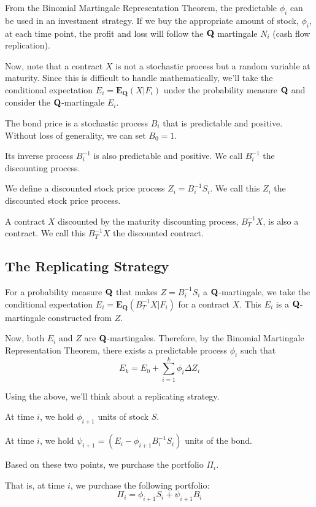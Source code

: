 \documentclass[uplatex,a4j,12pt,dvipdfmx]{jsarticle}
\begin{document}
From the Binomial Martingale Representation Theorem, the predictable $\phi_{i}$ can be used in an investment strategy. If we buy the appropriate amount of stock, $\phi_{i}$, at each time point, the profit and loss will follow the ${\bf Q}$ martingale $N_{i}$ (cash flow replication).

Now, note that a contract $X$ is not a stochastic process but a random variable at maturity. Since this is difficult to handle mathematically, we'll take the conditional expectation $E_{i} = \mathbf{E_{Q}}( X | F_{i} )$ under the probability measure ${\bf Q}$ and consider the ${\bf Q}$-martingale $E_{i}$.

The bond price is a stochastic process $B_{i}$ that is predictable and positive. Without loss of generality, we can set $B_{0} = 1$.

Its inverse process $B_{i}^{-1}$ is also predictable and positive. We call $B_{i}^{-1}$ the discounting process.

We define a discounted stock price process $Z_{i} = B_{i}^{-1} S_{i}$. We call this $Z_{i}$ the discounted stock price process.

A contract $X$ discounted by the maturity discounting process, $B_{T}^{-1} X$, is also a contract. We call this $B_{T}^{-1} X$ the discounted contract.

\subsection{The Replicating Strategy}
For a probability measure ${\bf Q}$ that makes $Z = B_{i}^{-1} S_{i}$ a ${\bf Q}$-martingale, we take the conditional expectation $E_{i} = \mathbf{E_{Q}}( B_{T}^{-1} X | F_{i} )$ for a contract $X$. This $E_{i}$ is a ${\bf Q}$-martingale constructed from $Z$.

Now, both $E_{i}$ and $Z$ are ${\bf Q}$-martingales. Therefore, by the Binomial Martingale Representation Theorem, there exists a predictable process $\phi_{i}$ such that \[E_{k} = E_{0} + \sum^{k}_{i=1} \phi_{i} \Delta Z_{i}\]

Using the above, we'll think about a replicating strategy.

At time $i$, we hold $\phi_{i+1}$ units of stock $S$.

At time $i$, we hold $\psi_{i+1} = ( E_{i} - \phi_{i+1} B_{i}^{-1} S_{i} )$ units of the bond.

Based on these two points, we purchase the portfolio $\Pi_{i}$.

That is, at time $i$, we purchase the following portfolio:\[\Pi_{i} = \phi_{i+1} S_{i} + \psi_{i+1} B_{i}\]
\end{document}
